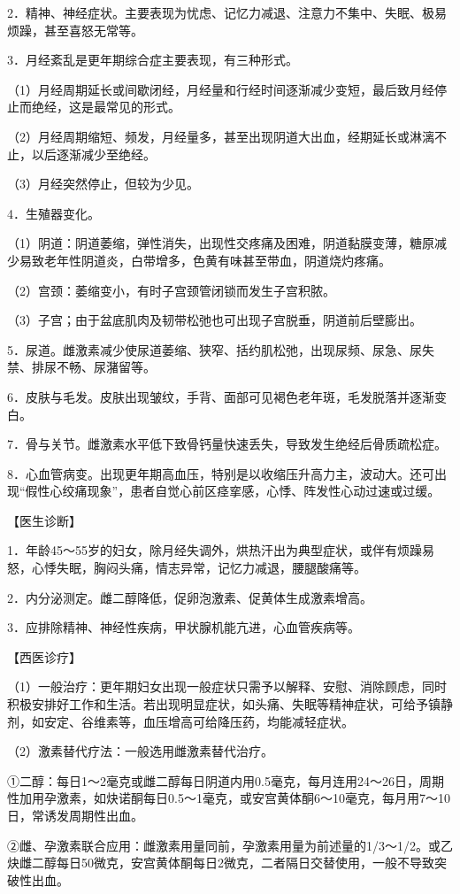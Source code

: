 \documentclass[12pt,UTF8]{ctexbook}
\begin{document}
2．精神、神经症状。主要表现为忧虑、记忆力减退、注意力不集中、失眠、极易烦躁，甚至喜怒无常等。

3．月经紊乱是更年期综合症主要表现，有三种形式。

（1）月经周期延长或间歇闭经，月经量和行经时间逐渐减少变短，最后致月经停止而绝经，这是最常见的形式。

（2）月经周期缩短、频发，月经量多，甚至出现阴道大出血，经期延长或淋漓不止，以后逐渐减少至绝经。

（3）月经突然停止，但较为少见。

4．生殖器变化。

（1）阴道：阴道萎缩，弹性消失，出现性交疼痛及困难，阴道黏膜变薄，糖原减少易致老年性阴道炎，白带增多，色黄有味甚至带血，阴道烧灼疼痛。

（2）宫颈：萎缩变小，有时子宫颈管闭锁而发生子宫积脓。

（3）子宫；由于盆底肌肉及韧带松弛也可出现子宫脱垂，阴道前后壁膨出。

5．尿道。雌激素减少使尿道萎缩、狭窄、括约肌松弛，出现尿频、尿急、尿失禁、排尿不畅、尿潴留等。

6．皮肤与毛发。皮肤出现皱纹，手背、面部可见褐色老年斑，毛发脱落并逐渐变白。

7．骨与关节。雌激素水平低下致骨钙量快速丢失，导致发生绝经后骨质疏松症。

8．心血管病变。出现更年期高血压，特别是以收缩压升高力主，波动大。还可出现“假性心绞痛现象”，患者自觉心前区痉挛感，心悸、阵发性心动过速或过缓。

【医生诊断】

1．年龄45～55岁的妇女，除月经失调外，烘热汗出为典型症状，或伴有烦躁易怒，心悸失眠，胸闷头痛，情志异常，记忆力减退，腰腿酸痛等。

2．内分泌测定。雌二醇降低，促卵泡激素、促黄体生成激素增高。

3．应排除精神、神经性疾病，甲状腺机能亢进，心血管疾病等。

【西医诊疗】

（1）一般治疗：更年期妇女出现一般症状只需予以解释、安慰、消除顾虑，同时积极安排好工作和生活。若出现明显症状，如头痛、失眠等精神症状，可给予镇静剂，如安定、谷维素等，血压增高可给降压药，均能减轻症状。

（2）激素替代疗法：一般选用雌激素替代治疗。

①二醇：每日1～2毫克或雌二醇每日阴道内用0.5毫克，每月连用24～26日，周期性加用孕激素，如炔诺酮每日0.5～1毫克，或安宫黄体酮6～10毫克，每月用7～10日，常诱发周期性出血。

②雌、孕激素联合应用：雌激素用量同前，孕激素用量为前述量的1/3～1/2。或乙炔雌二醇每日50微克，安宫黄体酮每日2微克，二者隔日交替使用，一般不导致突破性出血。
\end{document}
